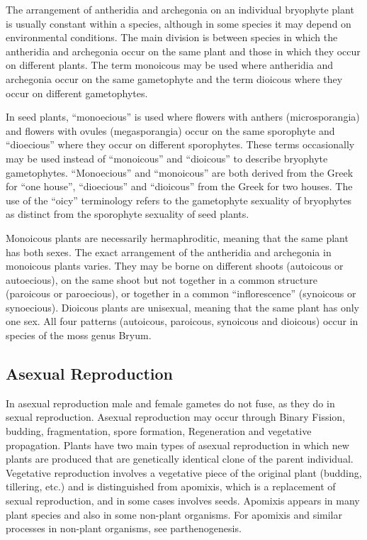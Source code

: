 The arrangement of antheridia and archegonia on an individual bryophyte plant is usually constant within a species, although in some species it may depend on environmental conditions. The main division is between species in which the antheridia and archegonia occur on the same plant and those in which they occur on different plants. The term monoicous may be used where antheridia and archegonia occur on the same gametophyte and the term dioicous where they occur on different gametophytes.

In seed plants, ``monoecious'' is used where flowers with anthers (microsporangia) and flowers with ovules (megasporangia) occur on the same sporophyte and ``dioecious'' where they occur on different sporophytes. These terms occasionally may be used instead of ``monoicous'' and ``dioicous'' to describe bryophyte gametophytes. ``Monoecious'' and ``monoicous'' are both derived from the Greek for ``one house'', ``dioecious'' and ``dioicous'' from the Greek for two houses. The use of the ``oicy'' terminology refers to the gametophyte sexuality of bryophytes as distinct from the sporophyte sexuality of seed plants.

Monoicous plants are necessarily hermaphroditic, meaning that the same plant has both sexes. The exact arrangement of the antheridia and archegonia in monoicous plants varies. They may be borne on different shoots (autoicous or autoecious), on the same shoot but not together in a common structure (paroicous or paroecious), or together in a common ``inflorescence'' (synoicous or synoecious). Dioicous plants are unisexual, meaning that the same plant has only one sex. All four patterns (autoicous, paroicous, synoicous and dioicous) occur in species of the moss genus Bryum.

\hypertarget{asexual-reproduction-1}{%
\subsection{Asexual Reproduction}\label{asexual-reproduction-1}}

In asexual reproduction male and female gametes do not fuse, as they do in sexual reproduction. Asexual reproduction may occur through Binary Fission, budding, fragmentation, spore formation, Regeneration and vegetative propagation. Plants have two main types of asexual reproduction in which new plants are produced that are genetically identical clone of the parent individual. Vegetative reproduction involves a vegetative piece of the original plant (budding, tillering, etc.) and is distinguished from apomixis, which is a replacement of sexual reproduction, and in some cases involves seeds. Apomixis appears in many plant species and also in some non-plant organisms. For apomixis and similar processes in non-plant organisms, see parthenogenesis.

